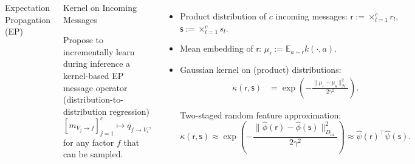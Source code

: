 \documentclass[english]{beamer}
\begin{document}
\begin{frame}
\begin{columns}[t]
\begin{block}{Expectation Propagation (EP)}


%
\end{block}

\begin{block}{Kernel on Incoming Messages}

Propose to incrementally learn during inference a kernel-based EP message operator 
(distribution-to-distribution regression) 
%
\begin{equation*}
    \left[ m_{V_j \rightarrow f}  \right]_{j=1}^c \mapsto q_{f \rightarrow V_i},
\end{equation*}
%
for any factor $f$ that can be sampled. 

\end{block}



\begin{itemize}
    \item Product distribution of $c$ incoming messages: 
        $\mathsf{r}:=\times_{l=1}^c r_{l}$, \hspace{5mm}
        $\mathsf{s}:=\times_{l=1}^c s_{l}$.     
    
    \item Mean embedding of $\mathsf{r}$:
        $\mu_{\mathsf{r}}:=\mathbb{E}_{a \sim \mathsf{r}}k(\cdot,a)$.

    \item Gaussian kernel on (product) distributions: 
        \begin{align*}
            \kappa(\mathsf{r}, \mathsf{s}) &= 
            \exp\left(-\frac{\|\mu_{\mathsf{r}}-\mu_{\mathsf{s}}\|_{\mathcal{H}}^{2}}{2\gamma^{2}}\right). 
        \end{align*}

Two-staged random feature approximation:
\begin{equation*}
    \kappa(\mathsf{r},
    \mathsf{s})\approx\exp\left(-\frac{
        \|\hat{\phi}(\mathsf{r})-\hat{\phi}(\mathsf{s})\|_{D_\mathrm{in}}^{2}}{2\gamma^{2}}\right)
        \approx
        \hat{\psi}(\mathsf{r})^\top \hat{\psi}(\mathsf{s}).
    \end{equation*}


\end{itemize}
\end{columns}
\end{frame}
\end{document}
